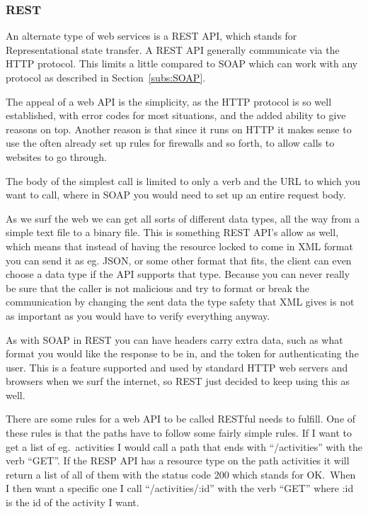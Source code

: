 \subsubsection{REST}
\label{subs:REST}
An alternate type of web services is a REST API, which stands for
Representational state transfer. A REST API generally communicate via the HTTP
protocol. This limits a little compared to SOAP which can work with any protocol
as described in Section~\ref{subs:SOAP}. 

The appeal of a web API is the simplicity, as the HTTP protocol is so well
established, with error codes for most situations, and the added ability to give
reasons on top. Another reason is that since it runs on HTTP it makes sense to
use the often already set up rules for firewalls and so forth, to allow calls to
websites to go through. 

The body of the simplest call is limited to only a verb and the URL to which you
want to call, where in SOAP you would need to set up an entire request body. 

As we surf the web we can get all sorts of different data types, all the way
from a simple text file to a binary file. This is something REST API's allow as
well, which means that instead of having the resource locked to come in XML
format you can send it as eg. JSON, or some other format that
fits\cite{rest:basic}, the client can even choose a data type if the API
supports that type. Because you can never really be sure that the caller is not 
malicious and try to format or break the communication by changing the sent data
the type safety that XML gives is not as important as you would have to verify
everything anyway. 

As with SOAP in REST you can have headers carry extra data, such as what format you
would like the response to be in, and the token for authenticating the user.
This is a feature supported and used by standard HTTP web servers and browsers when
we surf the internet, so REST just decided to keep using this as well. 

There are some rules for a web API to be called RESTful\cite{rest:msdn} needs to
fulfill. One of these rules is that the paths have to follow some fairly simple
rules. If I want to get a list of eg.\ activities I would call a path that ends
with ``/activities'' with the verb ``GET''. If the RESP API has a resource type on
the path activities it will return a list of all of them with the status code 200
which stands for OK.\ When I then want a specific one I call ``/activities/:id''
with the verb ``GET'' where :id is the id of the activity I want. 

